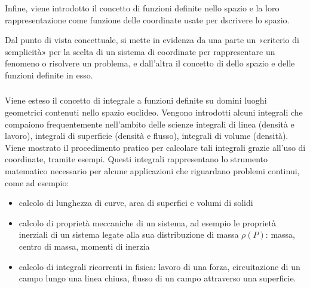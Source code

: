 \documentclass[letterpaper,10pt,italian]{jupyterBook}
\begin{document}
\sphinxAtStartPar
Infine, viene introdotto il concetto di  \sphinxhyphen{} funzioni definite nello spazio \sphinxhyphen{} e la loro rappresentazione come funzione delle coordinate usate per dscrivere lo spazio.

\sphinxAtStartPar
Dal punto di vista concettuale, si mette in evidenza da una parte un «criterio di semplicità» per la scelta di un sistema di coordinate per rappresentare un fenomeno o risolvere un problema, e dall’altra il concetto di  dello spazio e delle funzioni definite in esso.

\sphinxAtStartPar
  
\subsubsection*{}

\sphinxAtStartPar
Viene esteso il concetto di integrale a funzioni definite su domini \sphinxhyphen{} luoghi geometrici \sphinxhyphen{} contenuti nello spazio euclideo. Vengono introdotti alcuni integrali che compaiono frequentemente nell’ambito delle scienze \sphinxhyphen{} integrali di linea (densità e lavoro), integrali di superficie (densità e flusso), integrali di volume (densità). Viene mostrato il procedimento pratico per calcolare tali integrali grazie all’uso di coordinate, tramite esempi. Questi integrali rappresentano lo strumento matematico necessario per alcune applicazioni che riguardano problemi continui, come ad esempio:
\begin{itemize}
\item {} 
\sphinxAtStartPar
calcolo di lunghezza di curve, area di superfici e volumi di solidi

\item {} 
\sphinxAtStartPar
calcolo di proprietà meccaniche di un sistema, ad esempio le proprietà inerziali di un sistema legate alla sua distribuzione di massa \(\rho(P)\): massa, centro di massa, momenti di inerzia

\item {} 
\sphinxAtStartPar
calcolo di integrali ricorrenti in fisica: lavoro di una forza, circuitazione di un campo lungo una linea chiusa, flusso di un campo attraverso una superficie.

\end{itemize}
\end{document}
